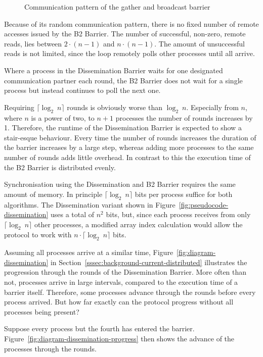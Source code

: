 \documentclass[a4paper, 10pt]{article}
\begin{document}
\begin{figure}[htbp]
	\centering
	
	\caption{Communication pattern of the gather and broadcast barrier}
	\label{fig:diagram-gather-broadcast}
\end{figure}

Because of its random communication pattern, there is no fixed number of remote accesses issued by the B2 Barrier. The number of successful, non-zero, remote reads, lies between $2 \cdot (n-1)$ and $n \cdot (n-1)$. The amount of unsuccessful reads is not limited, since the loop remotely polls other processes until all arrive.

Where a process in the Dissemination Barrier waits for one designated communication partner each round, the B2 Barrier does not wait for a single process but instead continues to poll the next one.

Requiring $\lceil \log _2~n \rceil$ rounds is obviously worse than $\log _2~n$. Especially from $n$, where $n$ is a power of two, to $n+1$ processes the number of rounds increases by 1. Therefore, the runtime of the Dissemination Barrier is expected to show a stair-esque behaviour. Every time the number of rounds increases the duration of the barrier increases by a large step, whereas adding more processes to the same number of rounds adds little overhead.
In contrast to this the execution time of the B2 Barrier is distributed evenly.

Synchronisation using the Dissemination and B2 Barrier requires the same amount of memory. In principle $\lceil \log _2~n \rceil$ bits per process suffice for both algorithms. The Dissemination variant shown in Figure~\ref{fig:pseudocode-dissemination} uses a total of $n^2$ bits, but, since each process receives from only $\lceil \log _2~n \rceil$ other processes, a modified array index calculation would allow the protocol to work with $n \cdot \lceil \log _2 ~n \rceil$ bits.

Assuming all processes arrive at a similar time, Figure~\ref{fig:diagram-dissemination} in Section~\ref{sssec:background-current-distributed} illustrates the progression through the rounds of the Dissemination Barrier. More often than not, processes arrive in large intervals, compared to the execution time of a barrier itself.
Therefore, some processes advance through the rounds before every process arrived.
But how far exactly can the protocol progress without all processes being present?

Suppose every process but the fourth has entered the barrier. Figure~\ref{fig:diagram-dissemination-progress} then shows the advance of the processes through the rounds.
\end{document}
